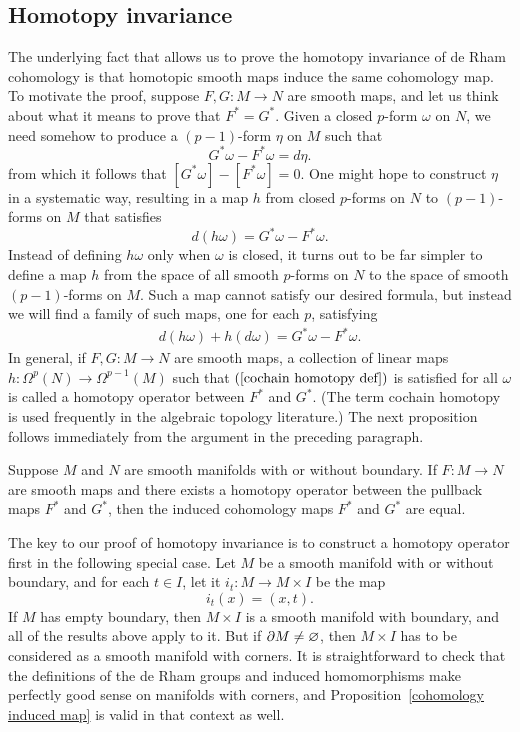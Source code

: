 \subsection{Homotopy invariance}
The underlying fact that allows us to prove the homotopy invariance of de Rham cohomology is that homotopic smooth maps induce the same cohomology map. To motivate the proof, suppose $F,G:M\to N$ are smooth maps, and let us think about what it means to prove that $F^*=G^*$. Given a closed $p$-form $\omega$ on $N$, we need somehow to produce a $(p-1)$-form $\eta$ on $M$ such that
\[G^*\omega-F^*\omega=d\eta.\]
from which it follows that $[G^*\omega]-[F^*\omega]=0$. One might hope to construct $\eta$ in a systematic way, resulting in a map $h$ from closed $p$-forms on $N$ to $(p-1)$-forms on $M$ that satisfies 
\[d(h\omega)=G^*\omega-F^*\omega.\]
Instead of defining $h\omega$ only when $\omega$ is closed, it turns out to be far simpler to define a map $h$ from the space of all smooth $p$-forms on $N$ to the space of smooth $(p-1)$-forms on $M$. Such a map cannot satisfy our desired formula, but instead we will find a family of such maps, one for each $p$, satisfying
\begin{align}\label{cochain homotopy def}
d(h\omega)+h(d\omega)=G^*\omega-F^*\omega.
\end{align}
In general, if $F,G:M\to N$ are smooth maps, a collection of linear maps $h:\Omega^p(N)\to\Omega^{p-1}(M)$ such that $(\ref{cochain homotopy def})$ is satisfied for all $\omega$ is called a homotopy operator between $F^*$ and $G^*$. (The term cochain homotopy is used frequently in the algebraic topology literature.) The next proposition follows immediately from the argument in the preceding paragraph.
\begin{proposition}
Suppose $M$ and $N$ are smooth manifolds with or without boundary. If $F:M\to N$ are smooth maps and there exists a homotopy operator between the pullback maps $F^*$ and $G^*$, then the induced cohomology maps $F^*$ and $G^*$ are equal.
\end{proposition}
The key to our proof of homotopy invariance is to construct a homotopy operator
first in the following special case. Let $M$ be a smooth manifold with or without boundary, and for each $t\in I$, let it $i_t:M\to M\times I$ be the map
\[i_t(x)=(x,t).\]
If $M$ has empty boundary, then $M\times I$ is a smooth manifold with boundary, and all of the results above apply to it. But if $\partial M\neq\varnothing$, then $M\times I$ has to be considered as a smooth manifold with corners. It is straightforward to check that the definitions of the de Rham groups and induced homomorphisms make perfectly good sense on manifolds with corners, and Proposition~\ref{cohomology induced map} is valid in that context as well.
